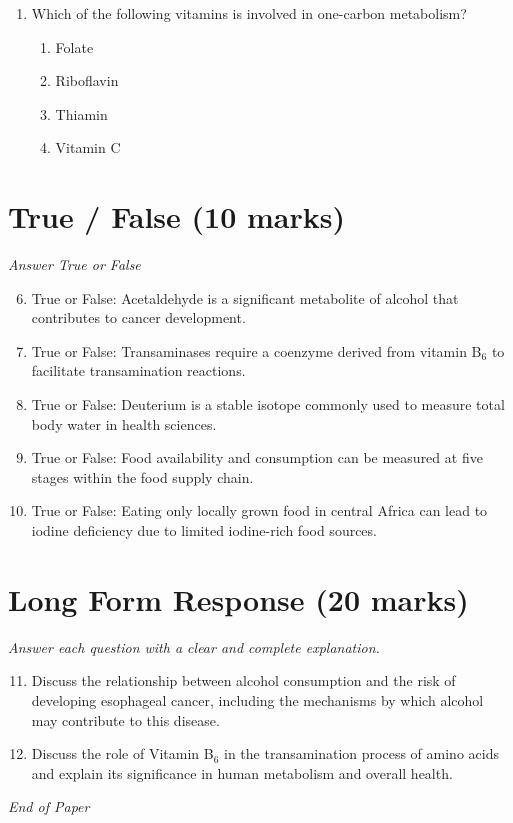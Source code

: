 \documentclass[12pt]{article}
\begin{document}
\begin{enumerate}[label=\arabic*.]
\begin{enumerate}[label=(\alph*)]
    \item 2 hour post prandial glucose \ensuremath{\geq} to 126 mg/dl
    \item fasting blood glucose \ensuremath{\geq} 126 mg/dl
\end{enumerate}
\item Which of the following vitamins is involved in one-carbon metabolism?
\begin{enumerate}[label=(\alph*)]
    \item Folate
    \item Riboflavin
    \item Thiamin
    \item Vitamin C
\end{enumerate}
\end{enumerate}

\section*{True / False (10 marks)}
\textit{Answer True or False}
\begin{enumerate}[label=\arabic*.]
\setcounter{enumi}{5}
\item True or False: Acetaldehyde is a significant metabolite of alcohol that contributes to cancer development.
\item True or False: Transaminases require a coenzyme derived from vitamin B$_{6}$ to facilitate transamination reactions.
\item True or False: Deuterium is a stable isotope commonly used to measure total body water in health sciences.
\item True or False: Food availability and consumption can be measured at five stages within the food supply chain.
\item True or False: Eating only locally grown food in central Africa can lead to iodine deficiency due to limited iodine-rich food sources.
\end{enumerate}

\section*{Long Form Response (20 marks)}
\textit{Answer each question with a clear and complete explanation.}
\begin{enumerate}[label=\arabic*.]
\setcounter{enumi}{10}
\item Discuss the relationship between alcohol consumption and the risk of developing esophageal cancer, including the mechanisms by which alcohol may contribute to this disease.
\item Discuss the role of Vitamin B$_{6}$ in the transamination process of amino acids and explain its significance in human metabolism and overall health.
\end{enumerate}

\vfill
\noindent\textit{End of Paper}
\end{document}
